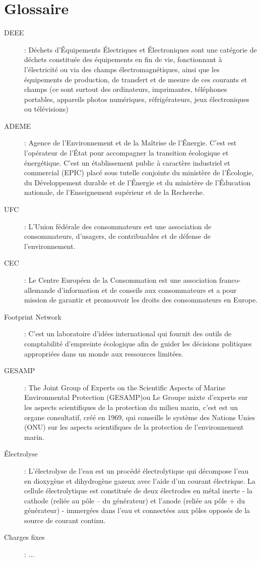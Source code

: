 \chapter{Glossaire}

\begin{description}

\item[DEEE] : Déchets d’Équipements Électriques et Électroniques sont une catégorie de déchets constituée des équipements en fin de vie, fonctionnant à l'électricité ou via des champs électromagnétiques, ainsi que les équipements de production, de transfert et de mesure de ces courants et champs (ce sont surtout des ordinateurs, imprimantes, téléphones portables, appareils photos numériques, réfrigérateurs, jeux électroniques ou télévisions) 

\item[ADEME] : Agence de l’Environnement et de la Maîtrise de l’Énergie. C'est est l'opérateur de l'État pour accompagner la transition écologique et énergétique. C'est un établissement public à caractère industriel et commercial (EPIC) placé sous tutelle conjointe du ministère de l’Écologie, du Développement durable et de l’Énergie et du ministère de l’Éducation nationale, de l’Enseignement supérieur et de la Recherche.

\item[UFC] : L'Union fédérale des consommateurs est une association de consommateurs, d'usagers, de contribuables et de défense de l'environnement.

\item[CEC] : Le Centre Européen de la Consommation est une association franco-allemande d’information et de conseils aux consommateurs et a pour mission  de garantir et promouvoir les droits des consommateurs en Europe.

\item[Footprint Network] : C'est un laboratoire d’idées international qui fournit des outils de comptabilité d'empreinte écologique afin de guider les décisions politiques appropriées dans un monde aux ressources limitées.

\item[GESAMP] : The Joint Group of Experts on the Scientific Aspects of Marine Environmental Protection (GESAMP)ou Le Groupe mixte d'experts sur les aspects scientifiques de la protection du milieu marin, c'est est un organe consultatif, créé en 1969, qui conseille le système des Nations Unies (ONU) sur les aspects scientifiques de la protection de l'environnement marin.

\item[Électrolyse] : L’électrolyse de l'eau est un procédé électrolytique qui décompose l'eau en dioxygène et dihydrogène gazeux avec l'aide d'un courant électrique. La cellule électrolytique est constituée de deux électrodes en métal inerte - la cathode (reliée au pôle – du générateur) et l'anode (reliée au pôle + du générateur) - immergées dans l'eau et connectées aux pôles opposés de la source de courant continu.

\item[Charges fixes] : ...


\end{description}